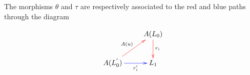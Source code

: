 \begin{frame}
The morphisms $\theta$ and $\tau$ are respectively associated to the red and blue paths through the diagram
\begin{block}{}
\begin{displaymath}
\xymatrix{
& A(L_0) \ar@[red][d]^{r_i} \\
A(L_0^{'}) \ar@[red][ur]^{A(u)} \ar@[blue][r]_-{r'_i} & L_1
}
\end{displaymath}
\end{block}
\end{frame}